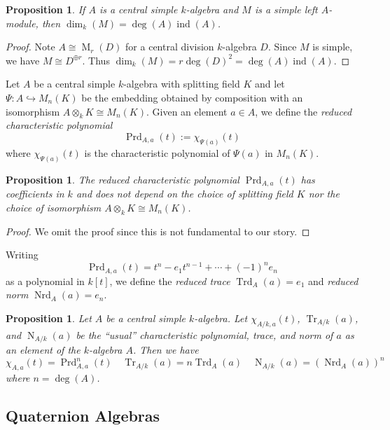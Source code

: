 \documentclass[12pt]{article}
\theoremstyle{plain}
\newtheorem{proposition}[theorem]{Proposition}
\theoremstyle{definition}
\theoremstyle{remark}
\numberwithin{equation}{section}
\begin{document}
\begin{proposition}
If $A$ is a central simple $k$-algebra and
$M$ is a simple left $A$-module, then
$\dim_k(M) =\deg(A) \operatorname{ind}(A)$.
\end{proposition}

\begin{proof}
Note $A \cong \operatorname{M}_r(D)$ for a central division $k$-algebra
$D$.
Since $M$ is simple, we have $M \cong D^{\oplus r}$.
Thus $\dim_k(M) = r \deg(D)^2=\deg(A) \operatorname{ind}(A)$.
\end{proof}

Let $A$ be a central simple $k$-algebra with splitting field $K$
and let $\Psi : A \hookrightarrow M_n(K)$ be the embedding
obtained by composition with an isomorphism $A \otimes_k K \cong
M_n(K)$.
Given an element $a \in A$, we define the
\emph{reduced characteristic polynomial}
\[
\operatorname{Prd}_{A,a}(t) := \chi_{\Psi(a)}(t)
\]
where $\chi_{\Psi(a)}(t)$ is the characteristic polynomial
of $\Psi(a)$ in $M_n(K)$.

\begin{proposition}
The reduced characteristic polynomial
$\operatorname{Prd}_{A,a}(t)$ has coefficients in $k$ and does not depend on
the choice of splitting field $K$ nor the choice of isomorphism
$A \otimes_k K \cong M_n(K)$.
\end{proposition}

\begin{proof}
We omit the proof since this is not fundamental to our story.
\end{proof}

Writing
\[
\operatorname{Prd}_{A,a}(t) = t^n - e_1t^{n-1} + \cdots + (-1)^n e_n
\]
as a polynomial in $k[t]$, we define
the \emph{reduced trace} $\operatorname{Trd}_A(a)=e_1$
and \emph{reduced norm} $\operatorname{Nrd}_A(a)=e_n$.

\begin{proposition}
Let $A$ be a central simple $k$-algebra.
Let $\chi_{A/k,a}(t)$, $\operatorname{Tr}_{A/k}(a)$, and
$\operatorname{N}_{A/k}(a)$
be the ``usual'' characteristic polynomial, trace, and norm
of $a$ as an element of the $k$-algebra $A$.
Then we have
\[
\chi_{A,a}(t)=\operatorname{Prd}_{A,a}^n(t) \quad
\operatorname{Tr}_{A/k}(a)=n\operatorname{Trd}_A(a) \quad
\operatorname{N}_{A/k}(a)=\left(\operatorname{Nrd}_A(a)\right)^n
\]
where $n=\deg(A)$.
\end{proposition}

\subsection{Quaternion Algebras}
\end{document}
